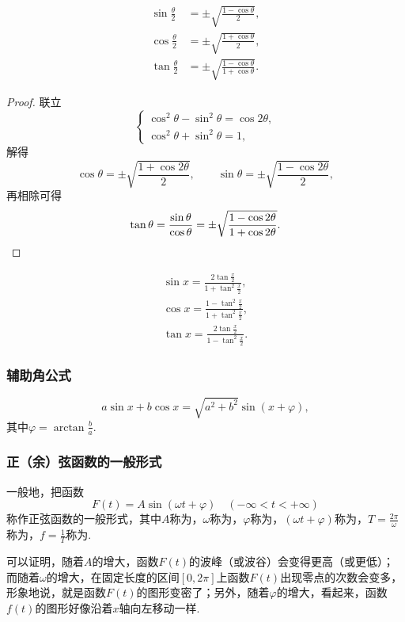 \begin{theorem}[半倍角公式]
\begin{align}
\sin \frac{\theta}{2} &= \pm \sqrt{\frac{1 - \cos \theta}{2}}, \\
\cos \frac{\theta}{2} &= \pm \sqrt{\frac{1 + \cos \theta}{2}}, \\
\tan \frac{\theta}{2} &= \pm \sqrt{\frac{1 - \cos \theta}{1 + \cos \theta}}.
\end{align}
\begin{proof}
联立\[
\left\{ \begin{array}{l}
\cos^2 \theta - \sin^2 \theta = \cos 2\theta, \\
\cos^2 \theta + \sin^2 \theta = 1,
\end{array} \right.
\]解得\[
\cos\theta = \pm\sqrt{\frac{1+\cos2\theta}{2}},
\qquad
\sin\theta = \pm\sqrt{\frac{1-\cos2\theta}{2}},
\]再相除可得\[
\tan\theta = \frac{\sin\theta}{\cos\theta} = \pm \sqrt{\frac{1 - \cos2\theta}{1 + \cos2\theta}}.
\qedhere
\]
\end{proof}
\end{theorem}

\begin{theorem}[万能公式]
\begin{gather}
\sin x = \frac{2 \tan\frac{x}{2}}{1+\tan^2\frac{x}{2}}, \\
\cos x = \frac{1-\tan^2\frac{x}{2}}{1+\tan^2\frac{x}{2}}, \\
\tan x = \frac{2 \tan\frac{x}{2}}{1-\tan^2\frac{x}{2}}.
\end{gather}
\end{theorem}

\subsubsection{辅助角公式}
\begin{theorem}[辅助角公式]
\begin{equation}
a \sin x + b \cos x = \sqrt{a^2 + b^2} \sin(x + \varphi),
\end{equation}其中\(\varphi = \arctan\frac{b}{a}\).
\end{theorem}

\subsubsection{正（余）弦函数的一般形式}
\begin{definition}
一般地，把函数\[
F(t) = A \sin(\omega t + \varphi) \quad (-\infty<t<+\infty)
\]称作正弦函数的一般形式，其中\(A\)称为，\(\omega\)称为，\(\varphi\)称为，\((\omega t + \varphi)\)称为，\(T = \frac{2\pi}{\omega}\)称为，\(f = \frac{1}{T}\)称为.
\end{definition}
可以证明，随着\(A\)的增大，函数\(F(t)\)的波峰（或波谷）会变得更高（或更低）；而随着\(\omega\)的增大，在固定长度的区间\([0,2\pi]\)上函数\(F(t)\)出现零点的次数会变多，形象地说，就是函数\(F(t)\)的图形变密了；另外，随着\(\varphi\)的增大，看起来，函数\(f(t)\)的图形好像沿着\(x\)轴向左移动一样.

